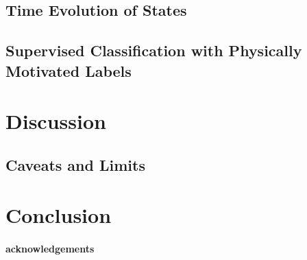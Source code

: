 \documentclass[12pt]{emulateapj}
\begin{document}
\subsection{Time Evolution of States}




\subsection{Supervised Classification with Physically Motivated Labels}




\section{Discussion}

\subsection{Caveats and Limits}

\section{Conclusion}

\paragraph{acknowledgements}



\end{document}
